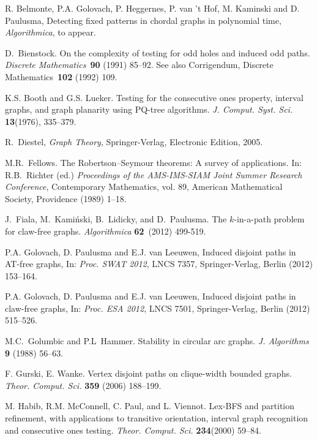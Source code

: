 \documentclass{llncs}
\begin{document}
\begin{thebibliography}{10}
R. Belmonte, P.A. Golovach, P. Heggernes, P. van 't Hof, M. Kaminski and D. Paulusma, Detecting fixed patterns in chordal graphs in polynomial time, {\em Algorithmica}, to appear.

D.~Bienstock.
On the complexity of testing for odd holes and induced odd paths.
{\em Discrete Mathematics}\ {\bf 90} (1991) 85--92. 
See also Corrigendum, Discrete Mathematics\ {\bf 102} (1992) 109.

K.S. Booth and G.S. Lueker.
Testing for the consecutive ones property, interval graphs, and graph planarity using PQ-tree algorithms.
{\em J. Comput. Syst. Sci.} {\bf 13}(1976), 335--379.

R.~Diestel,
{\em Graph Theory},
Springer-Verlag, Electronic Edition, 2005.


M.R.~Fellows.
The Robertson--Seymour theorems: A survey of applications.
In: R.B.~Richter (ed.) 
{\it Proceedings of the AMS-IMS-SIAM Joint Summer Research 
Conference}, 
Contemporary Mathematics, vol. 89, 
American Mathematical Society, Providence (1989) 
1--18.

J.~Fiala, M.~Kami\'nski, B.~Lidicky, and D.~Paulusma. The $k$-in-a-path problem for claw-free graphs. {\em Algorithmica} {\bf 62}\ (2012) 499-519.




P.A. Golovach, D. Paulusma and E.J. van Leeuwen, Induced disjoint paths in AT-free graphs, 
In: {\em Proc. SWAT 2012}, LNCS 7357, 
Springer-Verlag, Berlin 
(2012) 153--164.

P.A. Golovach, D. Paulusma and E.J. van Leeuwen, Induced disjoint paths in claw-free graphs, 
In: {\em Proc. ESA 2012}, LNCS 7501, Springer-Verlag, Berlin (2012) 515--526.

M.C.~Golumbic and P.L~Hammer.
Stability in circular arc graphs.
{\em J. Algorithms} {\bf 9} (1988) 56--63.

F. Gurski, E. Wanke.
Vertex disjoint paths on clique-width bounded graphs.
\emph{Theor. Comput. Sci.} {\bf 359} (2006) 188--199.

M. Habib, R.M. McConnell, C. Paul, and L. Viennot. 
Lex-BFS and partition refinement, with applications to transitive orientation, interval graph recognition and consecutive ones testing. 
{\em Theor. Comput. Sci.} {\bf 234}(2000) 59--84.



\end{thebibliography}
\end{document}

